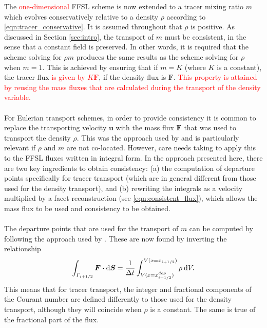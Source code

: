 \documentclass{ametsocV6.1}
\newcommand{\dx}[1]{\hspace{0.75mm}\mathrm{d}{#1}}
\newcommand{\change}[1]{\textcolor{red}{#1}}
\begin{document}
The \change{one-dimensional} FFSL scheme is now extended to a tracer mixing ratio $m$ which evolves conservatively relative to a density $\rho$ according to \eqref{eqn:tracer_conservative}.
It is assumed throughout that $\rho$ is positive.
As discussed in Section \ref{sec:intro}, the transport of $m$ must be consistent, in the sense that a constant field is preserved.
In other words, it is required that the scheme solving for $\rho m$ produces the same results as the scheme solving for $\rho$ when $m=1$.
This is achieved by ensuring that if $m=K$ (where $K$ is a constant), the tracer flux \change{is given by $K\bm{F}$}, if the density flux is $\bm{F}$.
\change{This property is attained by reusing the mass fluxes that are calculated during the transport of the density variable.}
\\
\\
For Eulerian transport schemes, in order to provide consistency it is common to replace the transporting velocity $\bm{u}$ with the mass flux $\bm{F}$ that was used to transport the density $\rho$. This was the approach used by \citet{bendall2023solution} and is particularly relevant if $\rho$ and $m$ are not co-located.
However, care needs taking to apply this to the FFSL fluxes written in integral form.
In the approach presented here, there are two key ingredients to obtain consistency:
(a) the computation of departure points specifically for tracer transport (which are in general different from those used for the density transport), and (b) rewriting the integrals as a velocity multiplied by a facet reconstruction (see \eqref{eqn:consistent_flux}), which allows the mass flux to be used and consistency to be obtained. \\
\\
The departure points that are used for the transport of $m$ can be computed by following the approach used by \cite{skamarock2006limiters}.
These are now found by inverting the relationship
\begin{equation}
\int_{\varGamma_{i+1/2}} \bm{F} \bm{\cdot} \mathrm{d}\bm{S} = \frac{1}{\Delta t} \int_{V(x=x^{dep}_{i+1/2})}^{V(x=x_{i+1/2})} \rho \dx{V}.
\end{equation}
This means that for tracer transport, the integer and fractional components of the Courant number are defined differently to those used for the density transport, although they will coincide when $\rho$ is a constant.
The same is true of the fractional part of the flux.
\end{document}
